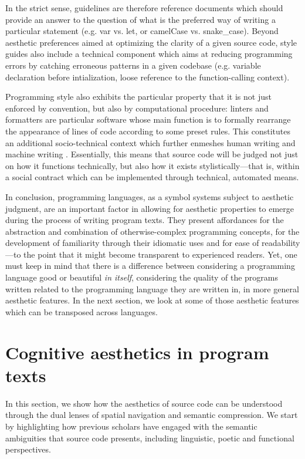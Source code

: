 In the strict sense, guidelines are therefore reference documents which should provide an answer to the question of what is the preferred way of writing a particular statement (e.g. var vs. let, or camelCase vs. snake\_case). Beyond aesthetic preferences aimed at optimizing the clarity of a given source code, style guides also include a technical component which aims at reducing programming errors by catching erroneous patterns in a given codebase (e.g. variable declaration before intialization, loose reference to the function-calling context).

Programming style also exhibits the particular property that it is not just enforced by convention, but also by computational procedure: linters and formatters are particular software whose main function is to formally rearrange the appearance of lines of code according to some preset rules. This constitutes an additional socio-technical context which further enmeshes human writing and machine writing \citep{depaz_discursive_2022}. Essentially, this means that source code will be judged not just on how it functions technically, but also how it exists stylistically—that is, within a social contract which can be implemented through technical, automated means.

\spacer

In conclusion, programming languages, as a symbol systems subject to aesthetic judgment, are an important factor in allowing for aesthetic properties to emerge during the process of writing program texts. They present affordances for the abstraction and combination of otherwise-complex programming concepts, for the development of familiarity through their idiomatic uses and for ease of readability—to the point that it might become transparent to experienced readers. Yet, one must keep in mind that there is a difference between considering a programming language good or beautiful \emph{in itself}, considering the quality of the programs written related to the programming language they are written in, in more general aesthetic features. In the next section, we look at some of those aesthetic features which can be transposed across languages.

\section{Cognitive aesthetics in program texts}
\label{sec:cognitive-aesthetics}

In this section, we show how the aesthetics of source code can be understood through the dual lenses of spatial navigation and semantic compression. We start by highlighting how previous scholars have engaged with the semantic ambiguities that source code presents, including linguistic, poetic and functional perspectives.

